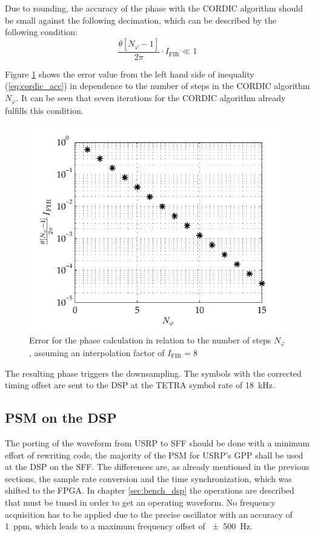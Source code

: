 Due to rounding, the accuracy of the phase with the CORDIC algorithm should be small against the following decimation, which can be described by the following condition:
\begin{equation}
\frac{\theta[N_\varphi-1]}{2\pi} \cdot I_\text{FIR}  \ll 1
\label{eq:cordic_acc}
\end{equation}

Figure \ref{fig:cordic_error} shows the error value from the left hand side of inequality (\ref{eq:cordic_acc}) in dependence to the number of steps in the CORDIC algorithm $N_\varphi$. It can be seen that seven iterations for the CORDIC algorithm already fulfills this condition.


\begin{figure}[htb]
	\centering
		\includegraphics{../kapitel04/figures/cordic_error.pdf}
	\caption{Error for the phase calculation in relation to the number of steps $N_\varphi$, assuming an interpolation factor of $I_\text{FIR}=8$}
	\label{fig:cordic_error}
\end{figure}

The resulting phase triggers the downsampling. The symbols with the corrected timing offset are sent to the DSP at the TETRA symbol rate of \SI{18}{kHz}.


\subsection{PSM on the DSP}
The porting of the waveform from USRP to SFF should be done with a minimum effort of rewriting code, the majority of the \ac{PSM} for USRP's GPP shall be used at the DSP on the SFF. The differences are, as already mentioned in the previous sections, the sample rate conversion and the time synchronization, which was shifted to the FPGA. In chapter \ref{sec:bench_dsp} the operations are described that must be tuned in order to get an operating waveform. No frequency acquisition has to be applied due to the precise oscillator with an accuracy of \SI{1}{ppm}, which leads to a maximum frequency offset of \SI{\pm 500}{Hz}.



